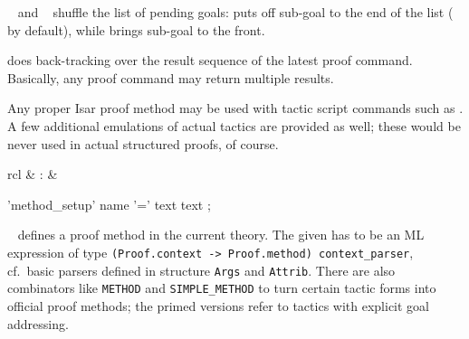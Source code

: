 \begin{isabellebody}
\begin{isamarkuptext}
\begin{description}
  \item \hyperlink{command.defer}{\mbox{}}~ and \hyperlink{command.prefer}{\mbox{}}~
  shuffle the list of pending goals: \hyperlink{command.defer}{\mbox{}} puts off
  sub-goal  to the end of the list ( by
  default), while \hyperlink{command.prefer}{\mbox{}} brings sub-goal  to the
  front.
  
  \item \hyperlink{command.back}{\mbox{}} does back-tracking over the result sequence
  of the latest proof command.  Basically, any proof command may
  return multiple results.
  
  \end{description}

  Any proper Isar proof method may be used with tactic script commands
  such as \hyperlink{command.apply}{\mbox{}}.  A few additional emulations of actual
  tactics are provided as well; these would be never used in actual
  structured proofs, of course.%
\end{isamarkuptext}%
\isamarkuptrue%
%
\isamarkuptrue%
%
\begin{isamarkuptext}%
\begin{matharray}{rcl}
    \hypertarget{command.method-setup}{\hyperlink{command.method-setup}{\mbox{}}} & : &  \\
  \end{matharray}

  \begin{rail}
    'method\_setup' name '=' text text
    ;
  \end{rail}

  \begin{description}

  \item \hyperlink{command.method-setup}{\mbox{}}~
  defines a proof method in the current theory.  The given  has to be an ML expression of type
  \verb|(Proof.context -> Proof.method) context_parser|, cf.\
  basic parsers defined in structure \verb|Args| and \verb|Attrib|.  There are also combinators like \verb|METHOD| and \verb|SIMPLE_METHOD| to turn certain tactic forms into official proof
  methods; the primed versions refer to tactics with explicit goal
  addressing.


\end{description}
\end{isamarkuptext}
\end{isabellebody}
